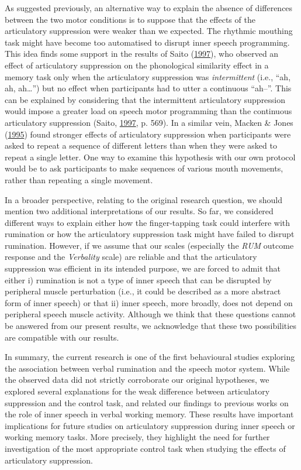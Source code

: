\documentclass[a4paper,12pt,twoside,openright,oldfontcommands,final]{memoir}
\begin{document}
As suggested previously, an alternative way to explain the absence of differences between the two motor conditions is to suppose that the effects of the articulatory suppression were weaker than we expected. The rhythmic mouthing task might have become too automatised to disrupt inner speech programming. This idea finds some support in the results of Saito (\protect\hyperlink{ref-saito_when_1997}{1997}), who observed an effect of articulatory suppression on the phonological similarity effect in a memory task only when the articulatory suppression was \emph{intermittent} (i.e., \enquote{ah, ah, ah\ldots{}}) but no effect when participants had to utter a continuous \enquote{ah--}. This can be explained by considering that the intermittent articulatory suppression would impose a greater load on speech motor programming than the continuous articulatory suppression (Saito, \protect\hyperlink{ref-saito_when_1997}{1997}, p. 569). In a similar vein, Macken \& Jones (\protect\hyperlink{ref-macken_functional_1995}{1995}) found stronger effects of articulatory suppression when participants were asked to repeat a sequence of different letters than when they were asked to repeat a single letter. One way to examine this hypothesis with our own protocol would be to ask participants to make sequences of various mouth movements, rather than repeating a single movement.

In a broader perspective, relating to the original research question, we should mention two additional interpretations of our results. So far, we considered different ways to explain either how the finger-tapping task could interfere with rumination or how the articulatory suppression task might have failed to disrupt rumination. However, if we assume that our scales (especially the \emph{RUM} outcome response and the \emph{Verbality} scale) are reliable and that the articulatory suppression was efficient in its intended purpose, we are forced to admit that either i) rumination is not a type of inner speech that can be disrupted by peripheral muscle perturbation (i.e., it could be described as a more abstract form of inner speech) or that ii) inner speech, more broadly, does not depend on peripheral speech muscle activity. Although we think that these questions cannot be answered from our present results, we acknowledge that these two possibilities are compatible with our results.

In summary, the current research is one of the first behavioural studies exploring the association between verbal rumination and the speech motor system. While the observed data did not strictly corroborate our original hypotheses, we explored several explanations for the weak difference between articulatory suppression and the control task, and related our findings to previous works on the role of inner speech in verbal working memory. These results have important implications for future studies on articulatory suppression during inner speech or working memory tasks. More precisely, they highlight the need for further investigation of the most appropriate control task when studying the effects of articulatory suppression.
\end{document}
